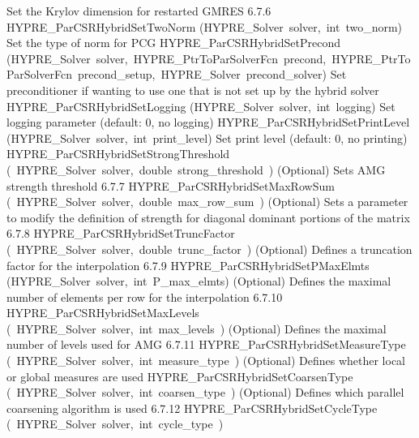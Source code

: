 \documentclass{article}
\begin{document}
\begin{cxxentry}
\begin{cxxentry}
\begin{cxxnames}
        {
Set the Krylov dimension for restarted GMRES}
        {6.7.6}
        {HYPRE\_ParCSRHybridSetTwoNorm}
        {(HYPRE\_Solver\ solver,\ int\ two\_norm)}
        {
Set the type of norm for PCG}
        {}
\label{cxx.6.7.33}
        {HYPRE\_ParCSRHybridSetPrecond}
        {(HYPRE\_Solver\ solver,\ HYPRE\_PtrToParSolverFcn\ precond,\ HYPRE\_PtrToParSolverFcn\ precond\_setup,\ HYPRE\_Solver\ precond\_solver)}
        {
Set preconditioner if wanting to use one that is not set up by
the hybrid solver}
        {}
\label{cxx.6.7.34}
        {HYPRE\_ParCSRHybridSetLogging}
        {(HYPRE\_Solver\ solver,\ int\ logging)}
        {
Set logging parameter (default: 0, no logging)}
        {}
\label{cxx.6.7.35}
        {HYPRE\_ParCSRHybridSetPrintLevel}
        {(HYPRE\_Solver\ solver,\ int\ print\_level)}
        {
Set print level (default: 0, no printing)}
        {}
\label{cxx.6.7.36}
        {HYPRE\_ParCSRHybridSetStrongThreshold}
        {(\ HYPRE\_Solver\ solver,\ double\ strong\_threshold\ )}
        {
(Optional) Sets AMG strength threshold}
        {6.7.7}
        {HYPRE\_ParCSRHybridSetMaxRowSum}
        {(\ HYPRE\_Solver\ solver,\ double\ max\_row\_sum\ )}
        {
(Optional) Sets a parameter to modify the definition of strength for
diagonal dominant portions of the matrix}
        {6.7.8}
        {HYPRE\_ParCSRHybridSetTruncFactor}
        {(\ HYPRE\_Solver\ solver,\ double\ trunc\_factor\ )}
        {
(Optional) Defines a truncation factor for the interpolation}
        {6.7.9}
        {HYPRE\_ParCSRHybridSetPMaxElmts}
        {(HYPRE\_Solver\ solver,\ int\ P\_max\_elmts)}
        {
(Optional) Defines the maximal number of elements per row for the interpolation}
        {6.7.10}
        {HYPRE\_ParCSRHybridSetMaxLevels}
        {(\ HYPRE\_Solver\ solver,\ int\ max\_levels\ )}
        {
(Optional) Defines the maximal number of levels used for AMG}
        {6.7.11}
        {HYPRE\_ParCSRHybridSetMeasureType}
        {(\ HYPRE\_Solver\ solver,\ int\ measure\_type\ )}
        {
(Optional) Defines whether local or global measures are used}
        {}
\label{cxx.6.7.37}
        {HYPRE\_ParCSRHybridSetCoarsenType}
        {(\ HYPRE\_Solver\ solver,\ int\ coarsen\_type\ )}
        {
(Optional) Defines which parallel coarsening algorithm is used}
        {6.7.12}
        {HYPRE\_ParCSRHybridSetCycleType}
        {(\ HYPRE\_Solver\ solver,\ int\ cycle\_type\ )}
        {
}
\end{cxxnames}
\end{cxxentry}
\end{cxxentry}
\end{document}
